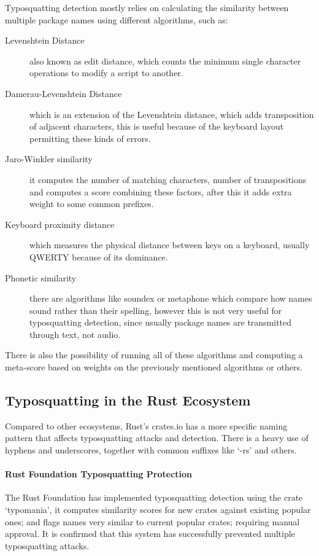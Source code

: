 Typosquatting detection mostly relies on calculating the similarity between multiple package names using different algorithms, such as:
\begin{description}
	\item[Levenshtein Distance] also known as edit distance, which counts the minimum single character operations to modify a script to another.
	\item[Damerau-Levenshtein Distance] which is an extension of the Levenshtein distance, which adds transposition of adjacent characters, this is useful because of the keyboard layout permitting these kinds of errors.
	\item[Jaro-Winkler similarity] it computes the number of matching characters, number of transpositions and computes a score combining these factors, after this it adds extra weight to some common prefixes.
	\item[Keyboard proximity distance] which measures the physical distance between keys on a keyboard, usually QWERTY because of its dominance.
	\item[Phonetic similarity] there are algorithms like soundex or metaphone which compare how names sound rather than their spelling, however this is not very useful for typosquatting detection, since usually package names are transmitted through text, not audio.
\end{description}

There is also the possibility of running all of these algorithms and computing a meta-score based on weights on the previously mentioned algorithms or others.

\subsection{Typosquatting in the Rust Ecosystem}\label{sect:typosquatting-rust}

Compared to other ecosystems, Rust's crates.io has a more specific naming pattern that affects typosquatting attacks and detection. There is a heavy use of hyphens and underscores, together with common suffixes like `-rs' and others.

\paragraph{Rust Foundation Typosquatting Protection}
The Rust Foundation has implemented typosquatting detection using the crate `typomania', it computes similarity scores for new crates against existing popular ones; and flags names very similar to current popular crates; requiring manual approval. It is confirmed that this system has successfully prevented multiple typosquatting attacks.


